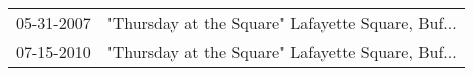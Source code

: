 \begin{supertabular}{ll}
 05-31-2007 &  "Thursday at the Square" Lafayette Square, Buf... \\
 07-15-2010 &  "Thursday at the Square" Lafayette Square, Buf... \\
\end{supertabular}
